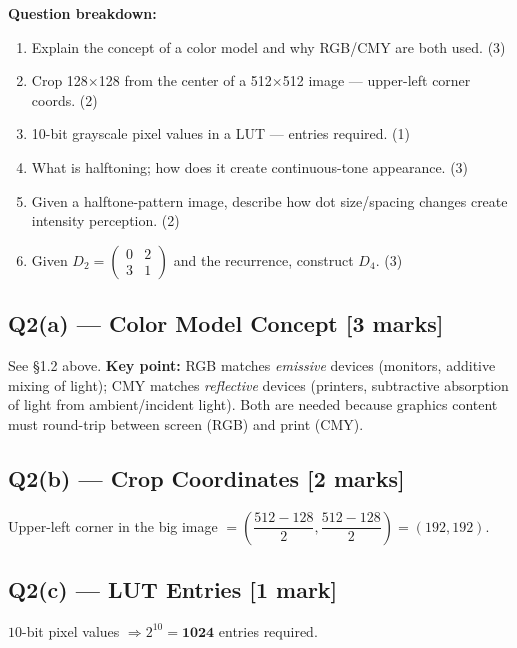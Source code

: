 \documentclass[12pt, a4paper]{article}
\newenvironment{solutionbox}{\begin{mdframed}[style=solutionframe]}{\end{mdframed}}
\newenvironment{answerbox}{\begin{mdframed}[style=answerframe]}{\end{mdframed}}
\begin{document}
\begin{solutionbox}
\textbf{Question breakdown:}
\begin{enumerate}[noitemsep]
  \item[Q2(a)] Explain the concept of a color model and why RGB/CMY are both used. (3)
  \item[Q2(b)] Crop 128$\times$128 from the center of a 512$\times$512 image --- upper-left corner coords. (2)
  \item[Q2(c)] 10-bit grayscale pixel values in a LUT --- entries required. (1)
  \item[Q2(d)] What is halftoning; how does it create continuous-tone appearance. (3)
  \item[Q3(a)] Given a halftone-pattern image, describe how dot size/spacing changes create intensity perception. (2)
  \item[Q3(b)] Given $D_2=\begin{pmatrix}0&2\\3&1\end{pmatrix}$ and the recurrence, construct $D_4$. (3)
\end{enumerate}
\end{solutionbox}

\subsection*{Q2(a) --- Color Model Concept [3 marks]}
See \S1.2 above. \textbf{Key point:} RGB matches \emph{emissive} devices (monitors, additive mixing of light); CMY matches \emph{reflective} devices (printers, subtractive absorption of light from ambient/incident light). Both are needed because graphics content must round-trip between screen (RGB) and print (CMY).

\subsection*{Q2(b) --- Crop Coordinates [2 marks]}
\begin{answerbox}
Upper-left corner in the big image $= \left(\dfrac{512-128}{2}, \dfrac{512-128}{2}\right) = (192, 192)$.
\end{answerbox}

\subsection*{Q2(c) --- LUT Entries [1 mark]}
\begin{answerbox}
$10$-bit pixel values $\Rightarrow 2^{10} = \mathbf{1024}$ entries required.
\end{answerbox}
\end{document}
